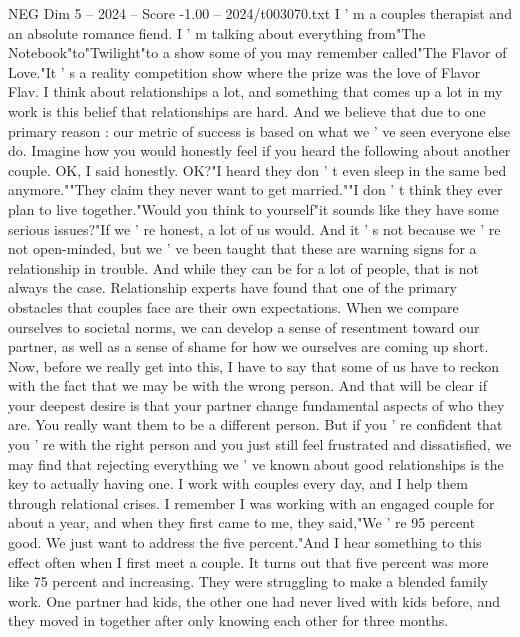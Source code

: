 \begin{textsample}{NEG Dim 5 – 2024 – Score -1.00 – 2024/t003070.txt}  \label{ex:f5_neg_015}
I ' m a couples therapist and an absolute romance fiend.
I ' m talking about everything from"The Notebook"to"Twilight"to a show some of you may remember called"The Flavor of Love."It ' s a reality competition show where the prize was the love of Flavor Flav.
I think about relationships a lot, and something that comes up a lot in my work is this belief that relationships are hard.
And we believe that due to one primary reason : our metric of success is based on what we ' ve seen everyone else do.
Imagine how you would honestly feel if you heard the following about another couple.
OK, I said honestly.
OK?"I heard they don ' t even sleep in the same bed anymore.""They claim they never want to get married.""I don ' t think they ever plan to live together."Would you think to yourself"it sounds like they have some serious issues?"If we ' re honest, a lot of us would.
And it ' s not because we ' re not open-minded, but we ' ve been taught that these are warning signs for a relationship in trouble.
And while they can be for a lot of people, that is not always the case.
Relationship experts have found that one of the primary obstacles that couples face are their own expectations.
When we compare ourselves to societal norms, we can develop a sense of resentment toward our partner, as well as a sense of shame for how we ourselves are coming up short.
Now, before we really get into this, I have to say that some of us have to reckon with the fact that we may be with the wrong person.
And that will be clear if your deepest desire is that your partner change fundamental aspects of who they are.
You really want them to be a different person.
But if you ' re confident that you ' re with the right person and you just still feel frustrated and dissatisfied, we may find that rejecting everything we ' ve known about good relationships is the key to actually having one.
I work with couples every day, and I help them through relational crises.
I remember I was working with an engaged couple for about a year, and when they first came to me, they said,"We ' re 95 percent good.
We just want to address the five percent."And I hear something to this effect often when I first meet a couple.
It turns out that five percent was more like 75 percent and increasing.
They were struggling to make a blended family work.
One partner had kids, the other one had never lived with kids before, and they moved in together after only knowing each other for three months.

\end{textsample}
